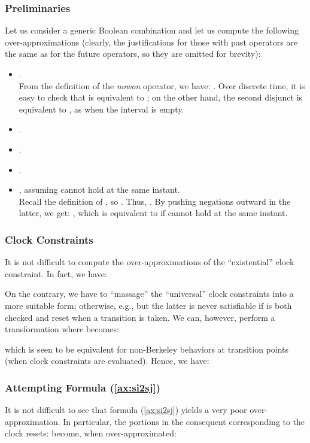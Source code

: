\documentclass[a4paper]{article}
\newcommand{\frf}[1]{(\ref{#1})}
\theoremstyle{plain}
\theoremstyle{definition}
\begin{document}
\subsubsection{Preliminaries} \label{sec:prelim}
Let us consider a generic Boolean combination  and let us compute the following over-ap\-prox\-i\-ma\-tions (clearly, the justifications for those with past operators are the same as for the future operators, so they are omitted for brevity):
\begin{itemize}
  \item . \\
	 From the definition of the \emph{nowon} operator, we have: .
	 Over discrete time, it is easy to check that  is equivalent to ; on the other hand, the second disjunct  is equivalent to , as when  the interval  is empty.

  \item .

  \item .
	 
  \item .

  \item , assuming  cannot hold at the same instant. \\
	 Recall the definition of , so .
	 Thus, .
	 By pushing negations outward in the latter, we get: , which is equivalent to  if  cannot hold at the same instant.
\end{itemize}



\subsubsection{Clock Constraints}
It is not difficult to compute the over-ap\-prox\-i\-ma\-tions of the ``existential'' clock constraint.
In fact, we have:


On the contrary, we have to ``massage'' the ``universal'' clock constraints into a more suitable form; otherwise, e.g.,  but the latter is never satisfiable if  is both checked and reset when a transition is taken.
We can, however, perform a transformation where  becomes:

which is seen to be equivalent for non-Berkeley behaviors at transition points (when clock constraints are evaluated).
Hence, we have:




\subsubsection{Attempting Formula \frf{ax:si2sj}} \label{sec:attempt}
It is not difficult to see that formula \frf{ax:si2sj} yields a very poor over-ap\-prox\-i\-ma\-tion.
In particular, the portions in the consequent corresponding to the clock resets:  become, when over-approximated:
\end{document}
